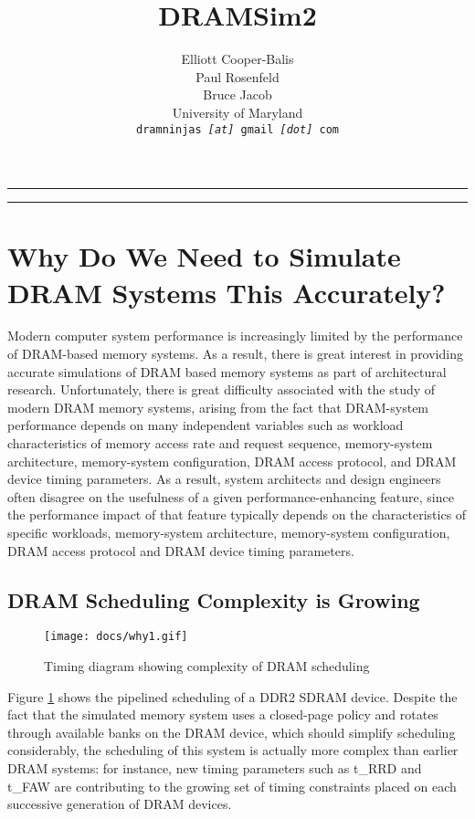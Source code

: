 \documentclass[11pt]{article}
\newcommand{\HRule}{\rule{\linewidth}{0.5mm}}
\begin{document}
\title{DRAMSim2}
\author{Elliott Cooper-Balis \\
      Paul Rosenfeld \\
      Bruce Jacob \\
      University of Maryland \\
      \texttt{\footnotesize dramninjas \textit{[at]} gmail \textit{[dot]} com}
}
\date{}
\maketitle
\HRule
\tableofcontents
\HRule
{}
\section{Why Do We Need to Simulate DRAM Systems This Accurately?}
Modern computer system performance is increasingly limited
by the performance of DRAM-based memory systems. As a result, there is great
interest in providing accurate simulations of DRAM based memory systems as part
of architectural research. Unfortunately, there is great difficulty associated
with the study of modern DRAM memory systems, arising from
the fact that DRAM-system performance depends on many
independent variables such as workload characteristics of memory access rate
and request sequence, memory-system architecture, memory-system configuration, DRAM
access protocol, and DRAM device timing parameters. As a result, system
architects and design engineers often disagree on the usefulness of a given
performance-enhancing feature, since the performance impact of that feature typically 
depends on the characteristics of specific workloads, memory-system architecture, 
memory-system configuration, DRAM access protocol and DRAM device timing parameters. 
\subsection{DRAM Scheduling Complexity is Growing}

\begin{figure}[h]
\begin{center}
\texttt{[image: docs/why1.gif]}
\caption{Timing diagram showing complexity of DRAM scheduling}
\label{timingcomplex}
\end{center}
\end{figure}
Figure \ref{timingcomplex} shows the pipelined scheduling of a DDR2 SDRAM device. Despite
the fact that the simulated memory system uses a closed-page policy and 
rotates through available banks on the DRAM device, which should simplify
scheduling considerably, the scheduling of this system is actually more
complex than earlier DRAM systems: for instance, new timing parameters
such as t_{RRD} and t_{FAW} are contributing to the growing
set of timing constraints placed on each successive generation of DRAM 
devices.
\end{document}
